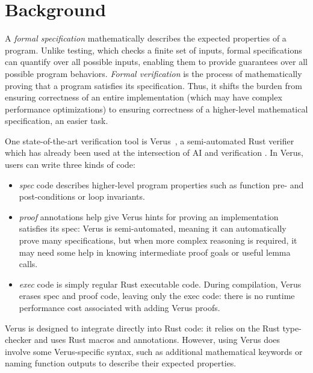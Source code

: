 \section{Background}
\label{background}

A \emph{formal specification} mathematically describes the expected properties of a program. 
Unlike testing, which checks a finite set of inputs, 
formal specifications can quantify over all possible inputs, 
enabling them to provide guarantees over all possible program behaviors.
\emph{Formal verification} is the process of mathematically proving that a program satisfies its specification.
Thus, it shifts the burden from ensuring correctness of an entire implementation 
(which may have complex performance optimizations)
to ensuring correctness of a higher-level mathematical specification, 
an easier task. 


One state-of-the-art verification tool is Verus~\cite{Verus}, a semi-automated Rust verifier which 
has already been used at the intersection
of AI and verification \cite{AutoVerus,alphaverus,verussage,RAGVerus,vericode}. 
In Verus, users can write three kinds of code: 
\begin{itemize}
    \item \emph{spec} code describes higher-level program properties such as function pre- and post-conditions
    or loop invariants.
    \item \emph{proof} annotations help give Verus hints for proving an implementation satisfies its spec:
    Verus is semi-automated, meaning it can automatically prove many specifications, 
    but when more complex reasoning is required,
    it may need some help in knowing intermediate proof goals 
    or useful lemma calls.
    \item \emph{exec} code is simply regular Rust executable code. 
    During compilation, Verus erases spec and proof code, 
    leaving only the exec code: 
    there is no runtime performance cost associated with adding Verus proofs.
\end{itemize}
Verus is designed to integrate directly into Rust code: 
it relies on the Rust type-checker and uses Rust macros and annotations.
However, using Verus does involve some Verus-specific syntax, 
such as additional mathematical keywords or naming function outputs to describe their expected properties.

